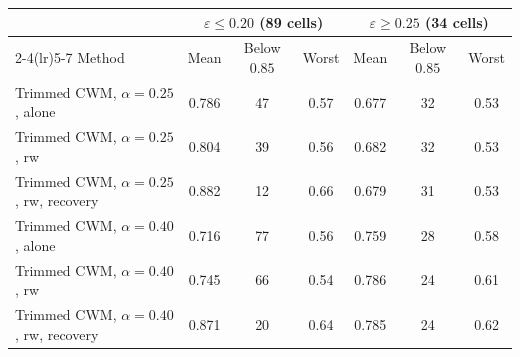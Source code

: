 \begin{tabular}{lcccccc}
\toprule
 & \multicolumn{3}{c}{$\varepsilon\le0.20$ (89 cells)} & \multicolumn{3}{c}{$\varepsilon\ge0.25$ (34 cells)} \\
\cmidrule(lr){2-4}\cmidrule(lr){5-7}
Method & Mean & Below $0.85$ & Worst & Mean & Below $0.85$ & Worst \\
\midrule
Trimmed CWM, $\alpha=0.25$, alone & 0.786 & 47 & 0.57 & 0.677 & 32 & 0.53 \\
Trimmed CWM, $\alpha=0.25$, rw & 0.804 & 39 & 0.56 & 0.682 & 32 & 0.53 \\
Trimmed CWM, $\alpha=0.25$, rw, recovery & 0.882 & 12 & 0.66 & 0.679 & 31 & 0.53 \\
Trimmed CWM, $\alpha=0.40$, alone & 0.716 & 77 & 0.56 & 0.759 & 28 & 0.58 \\
Trimmed CWM, $\alpha=0.40$, rw & 0.745 & 66 & 0.54 & 0.786 & 24 & 0.61 \\
Trimmed CWM, $\alpha=0.40$, rw, recovery & 0.871 & 20 & 0.64 & 0.785 & 24 & 0.62 \\
\bottomrule
\end{tabular}